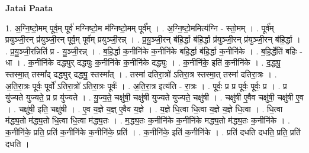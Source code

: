 \documentclass[17pt]{extarticle}
\begin{document}
\textbf{Jatai Paata} \newline

1. अ॒ग्नि॒ष्टो॒मम् पूर्व॒म् पूर्व॑ मग्निष्टो॒म म॑ग्निष्टो॒मम् पूर्व᳚म् । . अ॒ग्नि॒ष्टो॒ममित्य॑ग्नि - स्तो॒मम् । . पूर्व॑म् प्रयुञ्जी॒रन् प्र॑युञ्जी॒रन् पूर्व॒म् पूर्व॑म् प्रयुञ्जी॒रन्न् । . प्र॒यु॒ञ्जी॒रन् ब॑हि॒र्द्धा ब॑हि॒र्द्धा प्र॑युञ्जी॒रन् प्र॑युञ्जी॒रन् ब॑हि॒र्द्धा । . प्र॒यु॒ञ्जी॒रन्निति॑ प्र - यु॒ञ्जी॒रन्न् । . ब॒हि॒र्द्धा क॒नीनि॑के क॒नीनि॑के बहि॒र्द्धा ब॑हि॒र्द्धा क॒नीनि॑के । . ब॒हि॒र्द्धेति॑ बहिः - धा । . क॒नीनि॑के दद्ध्युर् दद्ध्युः क॒नीनि॑के क॒नीनि॑के दद्ध्युः । . क॒नीनि॑के॒ इति॑ क॒नीनि॑के । . द॒द्ध्यु॒ स्तस्मा॒त् तस्मा᳚द् दद्ध्युर् दद्ध्यु॒ स्तस्मा᳚त् । . तस्मा॑ दतिरा॒त्रो॑ ऽतिरा॒त्र स्तस्मा॒त् तस्मा॑ दतिरा॒त्रः । . अ॒ति॒रा॒त्रः पूर्वः॒ पूर्वो॑ ऽतिरा॒त्रो॑ ऽतिरा॒त्रः पूर्वः॑ । . अ॒ति॒रा॒त्र इत्य॑ति - रा॒त्रः । . पूर्वः॒ प्र प्र पूर्वः॒ पूर्वः॒ प्र । . प्र यु॑ज्यते युज्यते॒ प्र प्र यु॑ज्यते । . यु॒ज्य॒ते॒ चक्षु॑षी॒ चक्षु॑षी युज्यते युज्यते॒ चक्षु॑षी । . चक्षु॑षी ए॒वैव चक्षु॑षी॒ चक्षु॑षी ए॒व । . चक्षु॑षी॒ इति॒ चक्षु॑षी । . ए॒व य॒ज्ञे य॒ज्ञ् ए॒वैव य॒ज्ञे । . य॒ज्ञे धि॒त्वा धि॒त्वा य॒ज्ञे य॒ज्ञे धि॒त्वा । . धि॒त्वा म॑द्ध्य॒तो म॑द्ध्य॒तो धि॒त्वा धि॒त्वा म॑द्ध्य॒तः । . म॒द्ध्य॒तः क॒नीनि॑के क॒नीनि॑के मद्ध्य॒तो म॑द्ध्य॒तः क॒नीनि॑के । . क॒नीनि॑के॒ प्रति॒ प्रति॑ क॒नीनि॑के क॒नीनि॑के॒ प्रति॑ । . क॒नीनि॑के॒ इति॑ क॒नीनि॑के । . प्रति॑ दधति दधति॒ प्रति॒ प्रति॑ दधति । \newline
\end{document}
